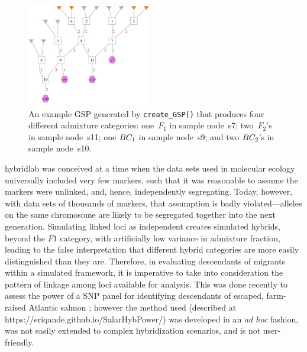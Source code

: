 \begin{figure}
\newcommand{\gspcaptwo}{\footnotesize
An example GSP generated by {\footnotesize\tt create\_GSP()} that produces four different
admixture categories: one~$F_1$ in sample node~s7; two~$F_2$'s in sample node~s11; one $\BC_1$ in sample node~s9; and two $\BC_2$'s in sample node~s10.
}
\begin{center}
\includegraphics[width=0.48\textwidth]{figures/AllThem.pdf}
\end{center}
\caption[\gspcaptwo]{\gspcaptwo}
\label{fig:gsp2}
\end{figure}

{\sc hybridlab} was conceived at a time when
the data sets used in molecular ecology universally included very few markers, such that
it was reasonable to assume the markers were unlinked, and, hence, independently segregating.
Today, however, with data sets of thousands of markers, that assumption is badly violated---alleles
on the same chromosome are likely to be segregated together into the next generation.
Simulating linked loci as independent creates simulated hybrids, beyond the $F1$ category, with 
artificially low variance in admixture fraction, leading to the false interpretation that different
hybrid categories are more easily distinguished than they are. Therefore, in evaluating descendants of migrants within a simulated framework, it is imperative to take into consideration the pattern of
linkage among loci available for analysis. This was done recently to assess the power of a SNP panel for identifying descendants of escaped, farm-raised Atlantic salmon \citep{wringe2019development}; however the method used (described at https://eriqande.github.io/SalarHybPower/) was developed in an {\em ad hoc} fashion, was not easily extended to
complex hybridization scenarios, and is not user-friendly.

